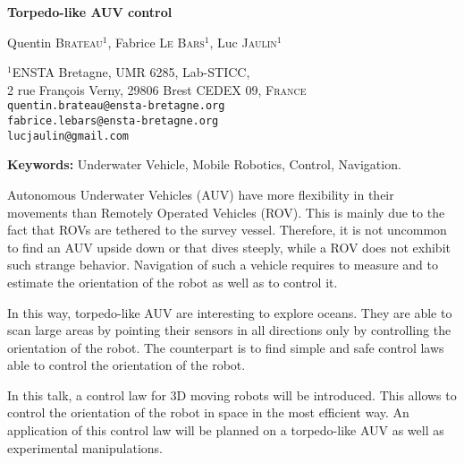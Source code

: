 \documentclass[14pt, a4paper]{article}
\begin{document}
	\begin{center}

		{\Large\bf Torpedo-like AUV control}

		\vspace*{0.8cm}

		{\large Quentin \textsc{Brateau}$^{1}$, Fabrice \textsc{Le Bars}$^{1}$, Luc \textsc{Jaulin}$^{1}$}

		\bigskip

		{\small $^{1}$ENSTA Bretagne, UMR 6285, Lab-STICC, \\
		2 rue François Verny, 29806 Brest CEDEX 09, \textsc{France} \\
		\medskip
		\texttt{quentin.brateau@ensta-bretagne.org}\\
		\texttt{fabrice.lebars@ensta-bretagne.org}\\
		\texttt{lucjaulin@gmail.com}\\
		}

	\end{center}

	\bigskip

	{\noindent\bf Keywords:} Underwater Vehicle, Mobile Robotics, Control, Navigation.

	Autonomous Underwater Vehicles (AUV) have more flexibility in their movements than Remotely Operated Vehicles (ROV). This is mainly due to the fact that ROVs are tethered to the survey vessel. Therefore, it is not uncommon to find an AUV upside down or that dives steeply, while a ROV does not exhibit such strange behavior. Navigation of such a vehicle requires to measure and to estimate the orientation of the robot as well as to control it.

	In this way, torpedo-like AUV are interesting to explore oceans. They are able to scan large areas by pointing their sensors in all directions only by controlling the orientation of the robot. The counterpart is to find simple and safe control laws able to control the orientation of the robot.
	
	In this talk, a control law for 3D moving robots will be introduced. This allows to control the orientation of the robot in space in the most efficient way. An application of this control law will be planned on a torpedo-like AUV as well as experimental manipulations.

	\medskip
\end{document}
